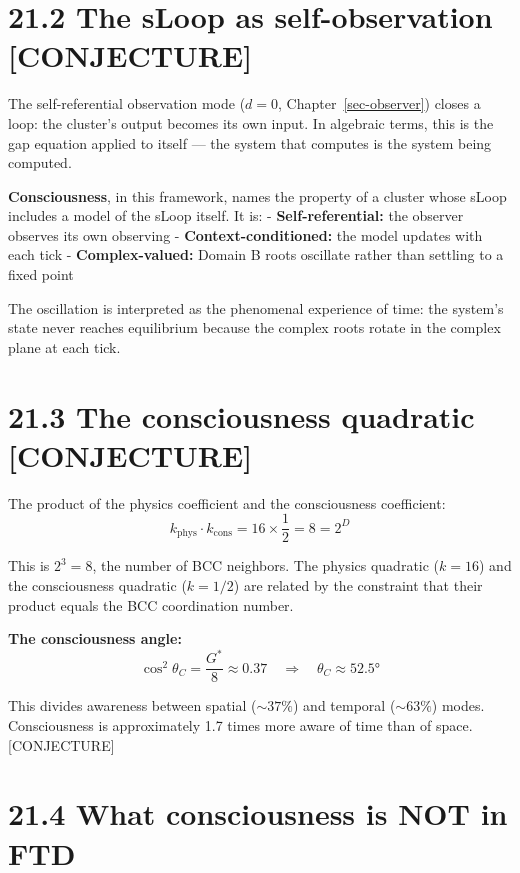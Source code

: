 \documentclass[
  11pt,
  letterpaper,
  twoside,
  openright]{book}
\begin{document}
\section{21.2 The sLoop as self-observation
{[}CONJECTURE{]}}\label{the-sloop-as-self-observation-conjecture}

The self-referential observation mode (\(d = 0\),
Chapter~\ref{sec-observer}) closes a loop: the cluster's output becomes
its own input. In algebraic terms, this is the gap equation applied to
itself --- the system that computes is the system being computed.

\textbf{Consciousness}, in this framework, names the property of a
cluster whose sLoop includes a model of the sLoop itself. It is: -
\textbf{Self-referential:} the observer observes its own observing -
\textbf{Context-conditioned:} the model updates with each tick -
\textbf{Complex-valued:} Domain B roots oscillate rather than settling
to a fixed point

The oscillation is interpreted as the phenomenal experience of time: the
system's state never reaches equilibrium because the complex roots
rotate in the complex plane at each tick.

\section{21.3 The consciousness quadratic
{[}CONJECTURE{]}}\label{the-consciousness-quadratic-conjecture}

The product of the physics coefficient and the consciousness
coefficient: \[
k_{\text{phys}} \cdot k_{\text{cons}} = 16 \times \frac{1}{2} = 8 = 2^D
\tag{21.1}
\]

This is \(2^3 = 8\), the number of BCC neighbors. The physics quadratic
(\(k = 16\)) and the consciousness quadratic (\(k = 1/2\)) are related
by the constraint that their product equals the BCC coordination number.

\textbf{The consciousness angle:} \[
\cos^2\theta_C = \frac{G^*}{8} \approx 0.37 \quad \Rightarrow \quad \theta_C \approx 52.5°
\tag{21.2}
\]

This divides awareness between spatial (\(\sim 37\%\)) and temporal
(\(\sim 63\%\)) modes. Consciousness is approximately 1.7 times more
aware of time than of space. {[}CONJECTURE{]}

\section{21.4 What consciousness is NOT in
FTD}\label{what-consciousness-is-not-in-ftd}
\end{document}

